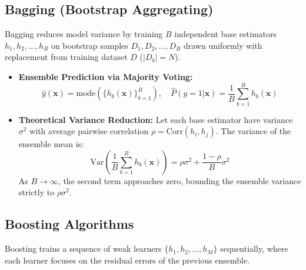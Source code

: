 \documentclass[12pt,a4paper]{article}
\begin{document}
\subsection{Bagging (Bootstrap Aggregating)}
Bagging reduces model variance by training $B$ independent base estimators $h_1, h_2, \dots, h_B$ on bootstrap samples $D_1, D_2, \dots, D_B$ drawn uniformly with replacement from training dataset $D$ ($|D_b| = N$).
\begin{itemize}
\item \textbf{Ensemble Prediction via Majority Voting:}
\begin{equation}
\hat{y}(\mathbf{x}) = \text{mode}\left(\{h_b(\mathbf{x})\}_{b=1}^B\right), \quad \hat{P}(y=1|\mathbf{x}) = \frac{1}{B} \sum_{b=1}^B h_b(\mathbf{x})
\end{equation}
\item \textbf{Theoretical Variance Reduction:} Let each base estimator have variance $\sigma^2$ with average pairwise correlation $\rho = \text{Corr}(h_i, h_j)$. The variance of the ensemble mean is:
\begin{equation}
\text{Var}\left( \frac{1}{B}\sum_{b=1}^B h_b(\mathbf{x}) \right) = \rho \sigma^2 + \frac{1-\rho}{B}\sigma^2
\end{equation}
As $B \to \infty$, the second term approaches zero, bounding the ensemble variance strictly to $\rho \sigma^2$.
\end{itemize}

\subsection{Boosting Algorithms}
Boosting trains a sequence of weak learners $\{h_1, h_2, \dots, h_M\}$ sequentially, where each learner focuses on the residual errors of the previous ensemble.
\end{document}
